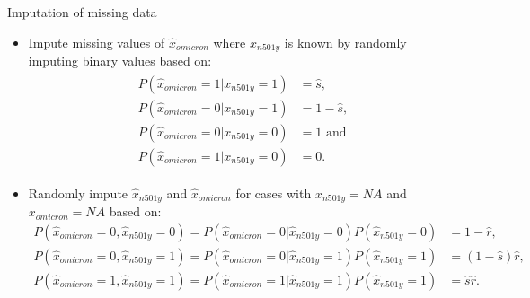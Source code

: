 \documentclass[
  ignorenonframetext,
  aspectratio=169,
]{beamer}
\providecommand{\tightlist}{%
  \setlength{\itemsep}{0pt}\setlength{\parskip}{0pt}}
\newcommand{\mli}[1]{\mathit{#1}}%
\begin{document}
\begin{frame}{Imputation of missing data}
\protect\hypertarget{imputation-of-missing-data}{}
\begin{itemize}
\tightlist
\item
  Impute missing values of \(\hat{x}_\mli{omicron}\) where
  \(x_\mli{n501y}\) is known by randomly imputing binary values based
  on: \begin{align*}
  \begin{split}
  P(\hat{x}_\mli{omicron}=1|x_\mli{n501y}=1)&=\hat{s},\\ P(\hat{x}_\mli{omicron}=0|x_\mli{n501y}=1)&=1-\hat{s},\\
  P(\hat{x}_\mli{omicron}=0|x_\mli{n501y}=0)&=1 \text{ and }\\ P(\hat{x}_\mli{omicron}=1|x_\mli{n501y}=0)&=0.
  \end{split}
  \end{align*} \pause
\item
  Randomly impute \(\hat{x}_\mli{n501y}\) and \(\hat{x}_\mli{omicron}\)
  for cases with \(x_\mli{n501y}=\mli{NA}\) and
  \(x_\mli{omicron}=\mli{NA}\) based on: \begin{align*}
  P(\hat{x}_\mli{omicron} = 0, \hat{x}_\mli{n501y} = 0) = P(\hat{x}_\mli{omicron} = 0 | \hat{x}_\mli{n501y} = 0)P(\hat{x}_\mli{n501y} = 0) &= 1 - \hat{r}, \\
  P(\hat{x}_\mli{omicron} = 0, \hat{x}_\mli{n501y} = 1) = P(\hat{x}_\mli{omicron} = 0 | \hat{x}_\mli{n501y} = 1)P(\hat{x}_\mli{n501y} = 1) &= (1 - \hat{s}) \hat{r}, \\
  P(\hat{x}_\mli{omicron} = 1, \hat{x}_\mli{n501y} = 1) = P(\hat{x}_\mli{omicron} = 1 | \hat{x}_\mli{n501y} = 1)P(\hat{x}_\mli{n501y} = 1) &= \hat{s}\hat{r}.
  \end{align*}
\end{itemize}
\end{frame}
\end{document}
